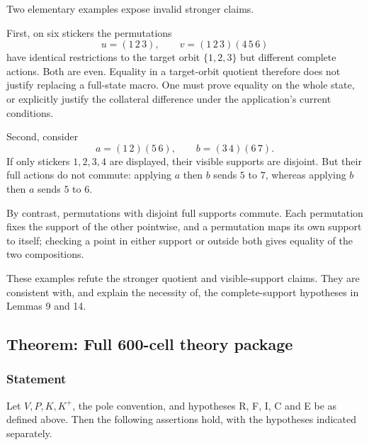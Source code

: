 \documentclass[
  10pt,
  a4paper,
]{article}
\begin{document}
Two elementary examples expose invalid stronger claims.

First, on six stickers the permutations \begin{equation}
u=(1\,2\,3),
\qquad
v=(1\,2\,3)(4\,5\,6)
\end{equation} have identical restrictions to the target orbit
\(\{1,2,3\}\) but different complete actions. Both are even. Equality in
a target-orbit quotient therefore does not justify replacing a
full-state macro. One must prove equality on the whole state, or
explicitly justify the collateral difference under the application's
current conditions.

Second, consider \begin{equation}
a=(1\,2)(5\,6),
\qquad
b=(3\,4)(6\,7).
\end{equation} If only stickers \(1,2,3,4\) are displayed, their visible
supports are disjoint. But their full actions do not commute: applying
\(a\) then \(b\) sends \(5\) to \(7\), whereas applying \(b\) then \(a\)
sends \(5\) to \(6\).

By contrast, permutations with disjoint full supports commute. Each
permutation fixes the support of the other pointwise, and a permutation
maps its own support to itself; checking a point in either support or
outside both gives equality of the two compositions.

These examples refute the stronger quotient and visible-support claims.
They are consistent with, and explain the necessity of, the
complete-support hypotheses in Lemmas 9 and 14.

\subsection{Theorem: Full 600-cell theory
package}\label{theorem-full-600-cell-theory-package}

\subsubsection{Statement}\label{statement-15}

Let \(V,P,K,K^+\), the pole convention, and hypotheses R, F, I, C and E
be as defined above. Then the following assertions hold, with the
hypotheses indicated separately.
\end{document}
